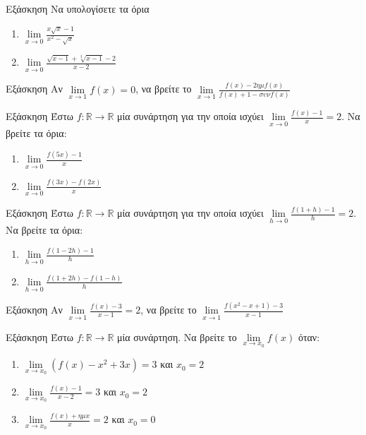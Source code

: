\documentclass[greek]{beamer}
\begin{document}
\begin{frame}{Εξάσκηση}
 Να υπολογίσετε τα όρια
 \begin{enumerate}
  \item $\lim\limits_{x \to 0}{ \frac{x\sqrt{x}-1}{x^2-\sqrt{x}} }$ \pause
  \item $\lim\limits_{x \to 0}{ \frac{\sqrt{x-1}+\sqrt[3]{x-1}-2}{x-2} }$
 \end{enumerate}
\end{frame}

\begin{frame}{Εξάσκηση}
 Αν $\lim\limits_{x \to 1}{ f(x) }=0$, να βρείτε το $\lim\limits_{x \to 1}{ \frac{f(x)-2ημf(x)}{f(x)+1-συνf(x)} }$
\end{frame}

\begin{frame}{Εξάσκηση}
 Έστω $f:\mathbb{R}\to\mathbb{R}$ μία συνάρτηση για την οποία ισχύει $\lim\limits_{x \to 0}{ \frac{f(x)-1}{x} }=2$. Να βρείτε τα όρια:
 \begin{enumerate}
  \item $\lim\limits_{x \to 0}{ \frac{f(5x)-1}{x} }$ \pause
  \item $\lim\limits_{x \to 0}{ \frac{f(3x)-f(2x)}{x} }$
 \end{enumerate}
\end{frame}

\begin{frame}{Εξάσκηση}
 Έστω $f:\mathbb{R}\to\mathbb{R}$ μία συνάρτηση για την οποία ισχύει $\lim\limits_{h \to 0}{ \frac{f(1+h)-1}{h} }=2$. Να βρείτε τα όρια:
 \begin{enumerate}
  \item $\lim\limits_{h \to 0}{ \frac{f(1-2h)-1}{h} }$ \pause
  \item $\lim\limits_{h \to 0}{ \frac{f(1+2h)-f(1-h)}{h} }$
 \end{enumerate}
\end{frame}

\begin{frame}{Εξάσκηση}
 Αν $\lim\limits_{x \to 1}{ \frac{f(x)-3}{x-1} }=2$, να βρείτε το $\lim\limits_{x \to 1}{ \frac{f(x^2-x+1)-3}{x-1} }$
\end{frame}

\begin{frame}{Εξάσκηση}
 Έστω $f:\mathbb{R}\to\mathbb{R}$ μία συνάρτηση. Να βρείτε το $\lim\limits_{x \to x_0}{ f(x) }$ όταν:
 \begin{enumerate}
  \item $\lim\limits_{x \to x_0}{\left(f(x)-x^2+3x  \right)=3  }$ και $x_0=2$ \pause
  \item $\lim\limits_{x \to x_0}{\frac{f(x)-1}{x-2}=3  }$ και $x_0=2$ \pause
  \item $\lim\limits_{x \to x_0}{\frac{f(x)+ημx}{x}=2  }$ και $x_0=0$
 \end{enumerate}
\end{frame}
\end{document}
